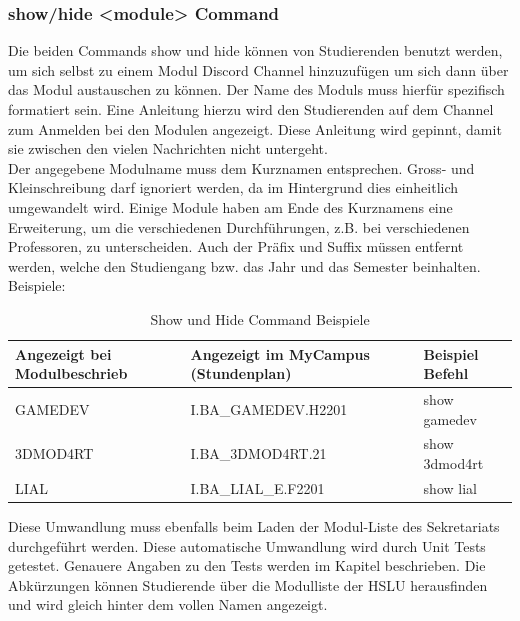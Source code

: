 \documentclass[a4paper, table]{article}
\begin{document}
\newpage
\subsubsection{show/hide <module> Command}
Die beiden Commands show und hide können von Studierenden benutzt werden, um sich selbst zu einem Modul Discord Channel hinzuzufügen um sich dann über das Modul austauschen zu können. 
Der Name des Moduls muss hierfür spezifisch formatiert sein. 
Eine Anleitung hierzu wird den Studierenden auf dem Channel zum Anmelden bei den Modulen angezeigt. 
Diese Anleitung wird gepinnt, damit sie zwischen den vielen Nachrichten nicht untergeht.\\
Der angegebene Modulname muss dem Kurznamen entsprechen. 
Gross- und Kleinschreibung darf ignoriert werden, da im Hintergrund dies einheitlich umgewandelt wird. 
Einige Module haben am Ende des Kurznamens eine Erweiterung, um die verschiedenen Durchführungen, \gls{z.B.} bei verschiedenen Professoren, zu unterscheiden. 
Auch der Präfix und Suffix müssen entfernt werden, welche den Studiengang \gls{bzw.} das Jahr und das Semester beinhalten.\\
Beispiele:

\begin{table}[h]
    \centering
    \begin{tabular}{|l|l|l|}
        \hline
        \rowcolor[gray]{.9} Angezeigt bei Modulbeschrieb & Angezeigt im MyCampus (Stundenplan) & Beispiel Befehl \\
        \hline
        GAMEDEV & I.BA\_GAMEDEV.H2201 & show gamedev \\
        \hline
        3DMOD4RT & I.BA\_3DMOD4RT.21 & show 3dmod4rt \\
        \hline
        LIAL & I.BA\_LIAL\_E.F2201 & show lial \\
        \hline
    \end{tabular}
    \caption{Show und Hide Command Beispiele}
    \label{tab: Show und Hide Command Beispiele}
\end{table}
Diese Umwandlung muss ebenfalls beim Laden der Modul-Liste des Sekretariats durchgeführt werden. 
Diese automatische Umwandlung wird durch Unit Tests getestet. 
Genauere Angaben zu den Tests werden im Kapitel  beschrieben. 
Die Abkürzungen können Studierende über die Modulliste der HSLU herausfinden und wird gleich hinter dem vollen Namen angezeigt.\autocite{noauthor_bachelor_nodate} \\
\end{document}
